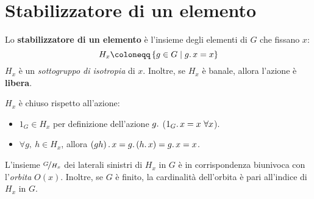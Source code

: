 \section{Stabilizzatore di un elemento}
\begin{define}
Lo \textbf{stabilizzatore di un elemento} è l'insieme degli elementi di $G$ che fissano $x$:
\begin{equation}
H_x\coloneqq \left\{g\in G\mid g\ldotp x = x\right\}
\end{equation}
$H_x$ è un \textit{sottogruppo di isotropia} di $x$. Inoltre, se $H_x$ è banale, allora l'azione è \textbf{libera}.
\end{define}
\begin{demonstration} $H_x$ è chiuso rispetto all'azione:
	\begin{itemize}
		\item $1_G\in H_x$ per definizione dell'azione $g\ldotp$ ($1_G\ldotp x=x\ \forall x$).
		\item $\forall g,\ h\in H_x$, allora $\left(gh\right)\ldotp x=g\ldotp \left(h\ldotp x\right)=g\ldotp x=x$.
	\end{itemize}
\end{demonstration}
\begin{observe}
L'insieme $\nicefrac{G}{H_x}$ dei laterali sinistri di $H_x$ in $G$ è in corrispondenza biunivoca con l'\textit{orbita} $O\left(x\right)$. Inoltre, se $G$ è finito, la cardinalità dell'orbita è pari all'indice di $H_x$ in $G$.
\end{observe}
